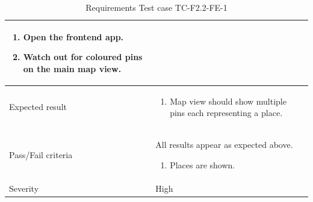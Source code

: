 \documentclass[11pt]{book}
\begin{document}
\begin{table}
\begin{tabular}{| p{3cm} | p{9.5cm} |}
                            \begin{enumerate}
                              \item Open the frontend app.
                              \item Watch out for coloured pins on the main map view.
                            \end{enumerate} \\ \hline 
    Expected result       & \begin{enumerate}
                              \item Map view should show multiple pins each representing a place.
                            \end{enumerate} \\ \hline 
    Pass/Fail criteria    & All results appear as expected above.
                            \begin{enumerate}
                              \item Places are shown.
                            \end{enumerate} \\ \hline 
    Severity              & High \\ \hline 
  \end{tabular}
  \caption{Requirements Test case TC-F2.2-FE-1}
  \label{tab:TCF2.2FE1}
\end{table}
\end{document}
